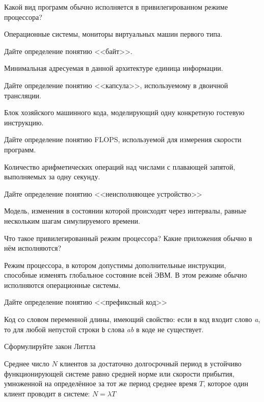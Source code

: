 \documentclass[a4paper, addpoints]{exam}
\begin{document}
\begin{questions}
\question[3] Какой вид программ обычно исполняется в привилегированном режиме процессора?
\begin{solution}[1cm]
Операционные системы, мониторы виртуальных машин первого типа.
\end{solution}

\question[3] Дайте определение понятию <<байт>>.
\begin{solution}[1cm]
Минимальная адресуемая в данной архитектуре единица информации.
\end{solution}

\question[3] Дайте определение понятию <<капсула>>, используемому в двоичной трансляции.
\begin{solution}[1cm]
Блок хозяйского машинного кода, моделирующий одну конкретную гостевую инструкцию.
\end{solution}
    
\question[3] Дайте определение понятию FLOPS, используемой для измерения скорости программ.
\begin{solution}[1cm]
Количество арифметических операций над числами с плавающей запятой, выполняемых за одну секунду.
\end{solution}

\question[3] Дайте определение понятию <<неисполняющее устройство>>
\begin{solution}[2cm]
Модель, изменения в состоянии которой происходят через интервалы, равные нескольким шагам симулируемого времени.
\end{solution}

\question[3] Что такое привилегированный режим процессора? Какие приложения обычно в нём исполняются?
\begin{solution}[2cm]
Режим процессора, в котором допустимы дополнительные инструкции, способные изменять глобальное состояние всей ЭВМ. В этом режиме обычно исполняются операционные системы.
\end{solution}

\question[3] Дайте определение понятию <<префиксный код>>
\begin{solution}[1cm]
Код со словом переменной длины, имеющий свойство: если в код входит слово \textit{a}, то для любой непустой строки \texttt{b} слова \textit{ab} в коде не существует. 
\end{solution}

\question[3] Сформулируйте закон Литтла
\begin{solution}[2cm]
Среднее число $N$ клиентов за достаточно долгосрочный период в устойчиво функционирующей системе  равно средней норме или скорости прибытия, умноженной на определённое за тот же период среднее время $T$, которое один клиент проводит в системе: $N = \lambda T$
\end{solution}


\end{questions}
\end{document}
